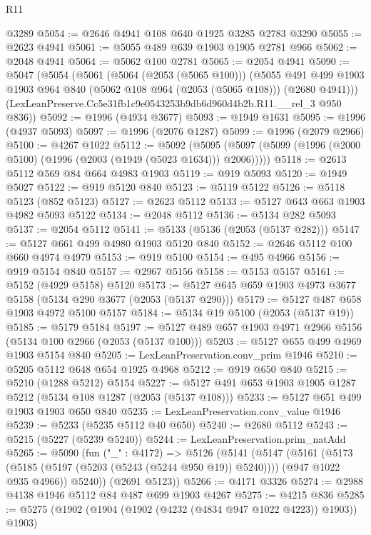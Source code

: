 \begin{lexlean}{R11}
\begin{coremodule}
    @3289
@5054 := @2646 @4941 @108 @640 @1925 @3285 @2783 @3290
@5055 := @2623 @4941
@5061 := @5055 @489 @639 @1903 @1905 @2781 @966
@5062 := @2048 @4941
@5064 := @5062 @100 @2781
@5065 := @2054 @4941
@5090 := @5047
    (@5054
      (@5061
        (@5064 (@2053 (@5065 @100)))
        (@5055
          @491
          @499
          @1903
          @1903
          @964
          @840
          (@5062 @108 @964 (@2053 (@5065 @108)))
          (@2680 @4941)))
      (LexLeanPreserve.Cc5e31fb1c9e0543253b9db6d960d4b2b.R11.__rel_3 @950 @836))
@5092 := @1996 (@4934 @3677)
@5093 := @1949 @1631
@5095 := @1996 (@4937 @5093)
@5097 := @1996 (@2076 @1287)
@5099 := @1996 (@2079 @2966)
@5100 := @4267 @1022
@5112 := @5092
    (@5095 (@5097 (@5099 (@1996 (@2000 @5100) (@1996 (@2003 (@1949 (@5023 @1634))) @2006)))))
@5118 := @2613 @5112 @569 @84 @664 @4983 @1903
@5119 := @919 @5093
@5120 := @1949 @5027
@5122 := @919 @5120 @840
@5123 := @5119 @5122
@5126 := @5118 @5123 (@852 @5123)
@5127 := @2623 @5112
@5133 := @5127 @643 @663 @1903 @4982 @5093 @5122
@5134 := @2048 @5112
@5136 := @5134 @282 @5093
@5137 := @2054 @5112
@5141 := @5133 (@5136 (@2053 (@5137 @282)))
@5147 := @5127 @661 @499 @4980 @1903 @5120 @840
@5152 := @2646 @5112 @100 @660 @4974 @4979
@5153 := @919 @5100
@5154 := @495 @4966
@5156 := @919 @5154 @840
@5157 := @2967 @5156
@5158 := @5153 @5157
@5161 := @5152 (@4929 @5158) @5120
@5173 := @5127 @645 @659 @1903 @4973 @3677 @5158 (@5134 @290 @3677 (@2053 (@5137 @290)))
@5179 := @5127 @487 @658 @1903 @4972 @5100 @5157
@5184 := @5134 @19 @5100 (@2053 (@5137 @19))
@5185 := @5179 @5184
@5197 := @5127 @489 @657 @1903 @4971 @2966 @5156 (@5134 @100 @2966 (@2053 (@5137 @100)))
@5203 := @5127 @655 @499 @4969 @1903 @5154 @840
@5205 := LexLeanPreservation.conv_prim @1946
@5210 := @5205 @5112 @648 @654 @1925 @4968
@5212 := @919 @650 @840
@5215 := @5210 (@1288 @5212) @5154
@5227 := @5127 @491 @653 @1903 @1905 @1287 @5212 (@5134 @108 @1287 (@2053 (@5137 @108)))
@5233 := @5127 @651 @499 @1903 @1903 @650 @840
@5235 := LexLeanPreservation.conv_value @1946
@5239 := @5233 (@5235 @5112 @40 @650)
@5240 := @2680 @5112
@5243 := @5215 (@5227 (@5239 @5240))
@5244 := LexLeanPreservation.prim_natAdd
@5265 := @5090
    (fun ("_" : @4172) =>
    @5126
      (@5141
        (@5147
          (@5161
            (@5173 (@5185 (@5197 (@5203 (@5243 (@5244 @950 @19)) @5240))))
            (@947 @1022 @935 @4966))
          @5240))
      (@2691 @5123))
@5266 := @4171 @3326
@5274 := @2988 @4138 @1946 @5112 @84 @487 @699 @1903 @4267
@5275 := @4215 @836
@5285 := @5275 (@1902 (@1904 (@1902 (@4232 (@4834 @947 @1022 @4223)) @1903)) @1903)

\end{coremodule}
\end{lexlean}
